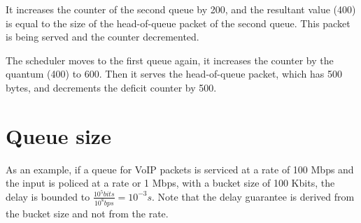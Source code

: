 It increases the counter of the second queue by 200, and the resultant value (400) is equal to the size of the head-of-queue packet of the second queue.
This packet is being served and the counter decremented.

The scheduler moves to the first queue again, it increases the counter by the quantum (400) to 600.
Then it serves the head-of-queue packet, which has 500 bytes, and decrements the deficit counter by 500.

\section{Queue size}

As an example, if a queue for VoIP packets is serviced at a rate of 100 Mbps and the input is policed at a rate or 1 Mbps, with a bucket size of 100 Kbits, the  delay is bounded to $\frac{10^5 bits}{10^8 bps} = 10^{-3}s$.
Note that the delay guarantee is derived from the bucket size and not from the rate.
